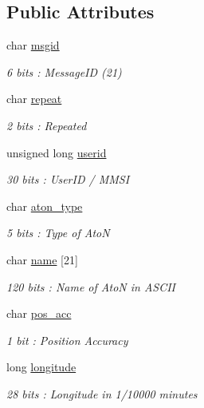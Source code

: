 \subsection*{Public Attributes}
\begin{DoxyCompactItemize}
\item 
char \mbox{\hyperlink{structaismsg__21_a67d7defa6e57063aae5cf9390f7a8f9d}{msgid}}
\begin{DoxyCompactList}\small\item\em 6 bits \+: Message\+ID (21) \end{DoxyCompactList}\item 
char \mbox{\hyperlink{structaismsg__21_aae372acd4123eae74e9d8d250e513745}{repeat}}
\begin{DoxyCompactList}\small\item\em 2 bits \+: Repeated \end{DoxyCompactList}\item 
unsigned long \mbox{\hyperlink{structaismsg__21_ac46f44ac1163cc96082341ab5864f657}{userid}}
\begin{DoxyCompactList}\small\item\em 30 bits \+: User\+ID / M\+M\+SI \end{DoxyCompactList}\item 
char \mbox{\hyperlink{structaismsg__21_afbf742d78ac3fd144bf01317b0d7840a}{aton\+\_\+type}}
\begin{DoxyCompactList}\small\item\em 5 bits \+: Type of AtoN \end{DoxyCompactList}\item 
char \mbox{\hyperlink{structaismsg__21_a7bbfaf31020fa81230fa9b0aa4041848}{name}} \mbox{[}21\mbox{]}
\begin{DoxyCompactList}\small\item\em 120 bits \+: Name of AtoN in A\+S\+C\+II \end{DoxyCompactList}\item 
char \mbox{\hyperlink{structaismsg__21_a44763870489c05c8faf73bacc9cda873}{pos\+\_\+acc}}
\begin{DoxyCompactList}\small\item\em 1 bit \+: Position Accuracy \end{DoxyCompactList}\item 
long \mbox{\hyperlink{structaismsg__21_aaaba1b630b483ebf5f4ee8cb9810bbca}{longitude}}
\begin{DoxyCompactList}\small\item\em 28 bits \+: Longitude in 1/10000 minutes \end{DoxyCompactList}\item 

\end{DoxyCompactItemize}

